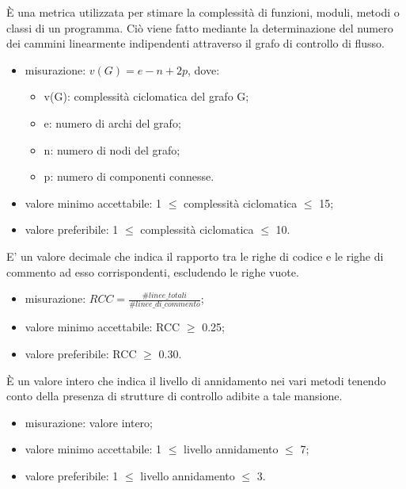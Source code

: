 		È una metrica utilizzata per stimare la complessità di funzioni, moduli, metodi o classi di un programma. Ciò viene fatto mediante la determinazione del numero dei cammini linearmente indipendenti attraverso il grafo di controllo di flusso.
		\begin{itemize}
			\item{misurazione: $v(G) = e - n + 2p$, dove: 
			\begin{itemize}
				\item{v(G)}: complessità ciclomatica del grafo G; 
				\item{e}: numero di archi del grafo; 
				\item{n}: numero di nodi del grafo; 
				\item{p}: numero di componenti connesse. 
			\end{itemize} }
			\item{valore minimo accettabile: 1 $\leq$ complessità ciclomatica $\leq$ 15;}
			\item{valore preferibile: 1 $\leq$ complessità ciclomatica $\leq$ 10.}
		\end{itemize}
			
		E' un valore decimale che indica il rapporto tra le righe di codice e le righe di commento ad esso corrispondenti, escludendo le righe vuote. 	
		\begin{itemize}
			\item{misurazione: $RCC = \displaystyle\frac{\#linee\_totali}{\#linee\_di\_commento} $;}
			\item{valore minimo accettabile: RCC $\geq$ 0.25;}
			\item{valore preferibile: RCC $\geq$ 0.30.}
		\end{itemize}

		È un valore intero che indica il livello di annidamento nei vari metodi tenendo conto della presenza di strutture di controllo adibite a tale mansione.		
		\begin{itemize}
			\item{misurazione: valore intero;}
			\item{valore minimo accettabile: 1 $\leq$ livello annidamento $\leq$ 7;}
			\item{valore preferibile: 1 $\leq$ livello annidamento $\leq$ 3.}
		\end{itemize}
			

